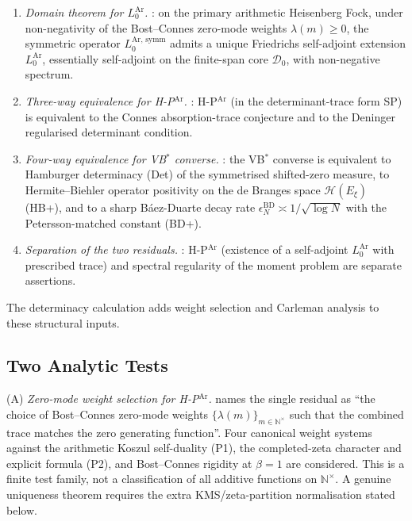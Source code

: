 \begin{enumerate}
\item \emph{Domain theorem for \(L_{0}^{\mathrm{Ar}}\).}
: on the primary arithmetic
Heisenberg Fock, under non-negativity of the Bost--Connes zero-mode
weights \(\lambda(m)\geq 0\), the symmetric operator
\(L_{0}^{\mathrm{Ar},\,\mathrm{symm}}\) admits a unique Friedrichs
self-adjoint extension \(L_{0}^{\mathrm{Ar}}\), essentially self-adjoint
on the finite-span core \(\mathcal{D}_{0}\), with non-negative spectrum.
\item \emph{Three-way equivalence for H-P\(^{\mathrm{Ar}}\).}
: H-P\(^{\mathrm{Ar}}\)
(in the determinant-trace form SP) is equivalent to the Connes
absorption-trace conjecture and to the Deninger regularised
determinant condition.
\item \emph{Four-way equivalence for VB\(^{*}\) converse.}
:
the VB\(^{*}\) converse is equivalent to Hamburger determinacy (Det) of
the symmetrised shifted-zero measure, to Hermite--Biehler operator
positivity on the de Branges space \(\mathcal{H}(E_{\xi})\) (HB+), and
to a sharp B\'aez-Duarte decay rate
\(\epsilon_{N}^{\mathrm{BD}}\asymp 1/\sqrt{\log N}\) with the
Petersson-matched constant (BD+).
\item \emph{Separation of the two residuals.}
: H-P\(^{\mathrm{Ar}}\)
(existence of a self-adjoint \(L_{0}^{\mathrm{Ar}}\) with prescribed
trace) and spectral regularity of the moment problem are separate
assertions.
\end{enumerate}

The determinacy calculation adds weight selection and Carleman
analysis to these structural inputs.

\subsection{Two Analytic Tests}
\label{v4-arith:hpar-det:wave3-obstruction}

(A) \emph{Zero-mode weight selection for H-P\(^{\mathrm{Ar}}\).}
 names the
single residual as ``the choice of Bost--Connes zero-mode weights
\(\{\lambda(m)\}_{m\in\mathbb{N}^{\times}}\) such that the combined
trace matches the zero generating function''. Four
canonical weight systems against the arithmetic Koszul
self-duality (P1), the completed-zeta character and explicit formula (P2), and
Bost--Connes rigidity at \(\beta=1\) are considered. This is a finite
test family, not a classification of all additive functions on
\(\mathbb{N}^{\times}\). A genuine uniqueness theorem requires the
extra KMS/zeta-partition normalisation stated below.

